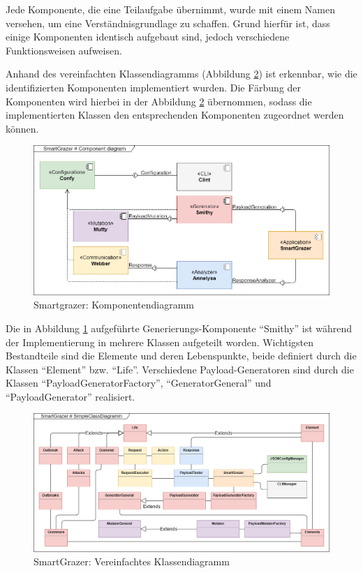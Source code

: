 Jede Komponente, die eine Teilaufgabe übernimmt, wurde mit einem Namen versehen, um eine Verständnisgrundlage zu schaffen. Grund hierfür ist, dass einige Komponenten identisch aufgebaut sind, jedoch verschiedene Funktionsweisen aufweisen.

Anhand des vereinfachten Klassendiagramms (Abbildung \ref{fig:simple-class-diagram})  ist erkennbar, wie die identifizierten Komponenten implementiert wurden. Die Färbung der Komponenten wird hierbei in der Abbildung \ref{fig:simple-class-diagram} übernommen, sodass die implementierten Klassen den entsprechenden Komponenten zugeordnet werden können.

\begin{figure}[htbp] 
	\centering
	\includegraphics[width=\textwidth]{contents/images/SmartGrazerComponentDiagram}
	\caption{Smartgrazer: Komponentendiagramm}
	\label{fig:component-diagram}
\end{figure}

Die in Abbildung \ref{fig:component-diagram} aufgeführte Generierungs-Komponente ``Smithy'' ist während der Implementierung in mehrere Klassen aufgeteilt worden. Wichtigsten Bestandteile sind die Elemente und deren Lebenspunkte, beide definiert durch die Klassen ``Element'' bzw. ``Life''. Verschiedene Payload-Generatoren sind durch die Klassen ``PayloadGeneratorFactory'', ``GeneratorGeneral'' und ``PayloadGenerator'' realisiert.

\begin{figure}[htbp] 
	\centering
	\includegraphics[width=\textwidth]{contents/images/SmartGrazerSimpleClassDiagram}
	\caption{SmartGrazer: Vereinfachtes Klassendiagramm}
	\label{fig:simple-class-diagram}
\end{figure}

